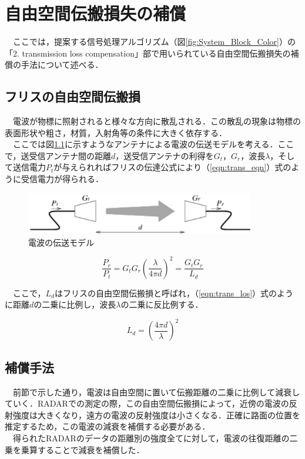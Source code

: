 \chapter{自由空間伝搬損失の補償}
　ここでは，提案する信号処理アルゴリズム（図\ref{fig:System_Block_Color}）の「2. transmission loss compensation」部で用いられている自由空間伝搬損失の補償の手法について述べる．

\section{フリスの自由空間伝搬損}
　電波が物標に照射されると様々な方向に散乱される．この散乱の現象は物標の表面形状や粗さ，材質，入射角等の条件に大きく依存する．\\
　ここでは図\ref{fig:trans_model}に示すようなアンテナによる電波の伝送モデルを考える．ここで，送受信アンテナ間の距離$d$，送受信アンテナの利得を$G_t$，$G_r$，波長$\lambda$，そして送信電力$P_t$が与えられればフリスの伝達公式により（\ref{eqn:trans_eqn}）式のように受信電力が得られる\cite{RADAR_book}．

\begin{figure}[H]
    \centering
    \includegraphics[width=10cm]{./fig/trans_model.png}
    \caption{電波の伝送モデル}
    \label{fig:trans_model}
\end{figure}

\begin{equation}
    \frac{P_r}{P_t} = G_t G_r \left(\frac{\lambda}{4 \pi d}\right)^2 = \frac{G_t G_r}{L_d}
    \label{eqn:trans_eqn}
\end{equation}


　ここで，$L_d$はフリスの自由空間伝搬損と呼ばれ，（\ref{eqn:trans_los}）式のように距離$d$の二乗に比例し，波長$\lambda$の二乗に反比例する．

\begin{equation}
L_d = \left(\frac{4 \pi d}{\lambda}\right)^2
\label{eqn:trans_los}
\end{equation}

\section{補償手法}
　前節で示した通り，電波は自由空間に置いて伝搬距離の二乗に比例して減衰していく．RADARでの測定の際，この自由空間伝搬損によって，近傍の電波の反射強度は大きくなり，遠方の電波の反射強度は小さくなる．正確に路面の位置を推定するため，この電波の減衰を補償する必要がある．\\
　得られたRADARのデータの距離別の強度全てに対して，電波の往復距離の二乗を乗算することで減衰を補償した．


